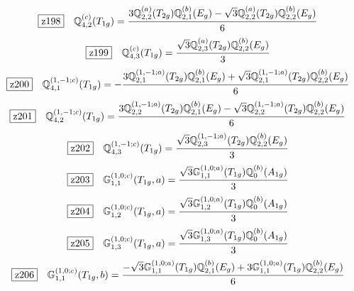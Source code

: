 \documentclass[fleqn,10pt,landscape]{jsarticle}
\begin{document}
\begin{dmath*}
\hspace*{3mm}\fbox{z198}\quad \mathbb{Q}_{4,2}^{(c)}(T_{1g})=\frac{3 \mathbb{Q}_{2,2}^{(a)}(T_{2g}) \mathbb{Q}_{2,1}^{(b)}(E_{g}) - \sqrt{3} \mathbb{Q}_{2,2}^{(a)}(T_{2g}) \mathbb{Q}_{2,2}^{(b)}(E_{g})}{6}
\end{dmath*}
\begin{dmath*}
\hspace*{3mm}\fbox{z199}\quad \mathbb{Q}_{4,3}^{(c)}(T_{1g})=\frac{\sqrt{3} \mathbb{Q}_{2,3}^{(a)}(T_{2g}) \mathbb{Q}_{2,2}^{(b)}(E_{g})}{3}
\end{dmath*}
\begin{dmath*}
\hspace*{3mm}\fbox{z200}\quad \mathbb{Q}_{4,1}^{(1,-1;c)}(T_{1g})=- \frac{3 \mathbb{Q}_{2,1}^{(1,-1;a)}(T_{2g}) \mathbb{Q}_{2,1}^{(b)}(E_{g}) + \sqrt{3} \mathbb{Q}_{2,1}^{(1,-1;a)}(T_{2g}) \mathbb{Q}_{2,2}^{(b)}(E_{g})}{6}
\end{dmath*}
\begin{dmath*}
\hspace*{3mm}\fbox{z201}\quad \mathbb{Q}_{4,2}^{(1,-1;c)}(T_{1g})=\frac{3 \mathbb{Q}_{2,2}^{(1,-1;a)}(T_{2g}) \mathbb{Q}_{2,1}^{(b)}(E_{g}) - \sqrt{3} \mathbb{Q}_{2,2}^{(1,-1;a)}(T_{2g}) \mathbb{Q}_{2,2}^{(b)}(E_{g})}{6}
\end{dmath*}
\begin{dmath*}
\hspace*{3mm}\fbox{z202}\quad \mathbb{Q}_{4,3}^{(1,-1;c)}(T_{1g})=\frac{\sqrt{3} \mathbb{Q}_{2,3}^{(1,-1;a)}(T_{2g}) \mathbb{Q}_{2,2}^{(b)}(E_{g})}{3}
\end{dmath*}
\begin{dmath*}
\hspace*{3mm}\fbox{z203}\quad \mathbb{G}_{1,1}^{(1,0;c)}(T_{1g},a)=\frac{\sqrt{3} \mathbb{G}_{1,1}^{(1,0;a)}(T_{1g}) \mathbb{Q}_{0}^{(b)}(A_{1g})}{3}
\end{dmath*}
\begin{dmath*}
\hspace*{3mm}\fbox{z204}\quad \mathbb{G}_{1,2}^{(1,0;c)}(T_{1g},a)=\frac{\sqrt{3} \mathbb{G}_{1,2}^{(1,0;a)}(T_{1g}) \mathbb{Q}_{0}^{(b)}(A_{1g})}{3}
\end{dmath*}
\begin{dmath*}
\hspace*{3mm}\fbox{z205}\quad \mathbb{G}_{1,3}^{(1,0;c)}(T_{1g},a)=\frac{\sqrt{3} \mathbb{G}_{1,3}^{(1,0;a)}(T_{1g}) \mathbb{Q}_{0}^{(b)}(A_{1g})}{3}
\end{dmath*}
\begin{dmath*}
\hspace*{3mm}\fbox{z206}\quad \mathbb{G}_{1,1}^{(1,0;c)}(T_{1g},b)=\frac{- \sqrt{3} \mathbb{G}_{1,1}^{(1,0;a)}(T_{1g}) \mathbb{Q}_{2,1}^{(b)}(E_{g}) + 3 \mathbb{G}_{1,1}^{(1,0;a)}(T_{1g}) \mathbb{Q}_{2,2}^{(b)}(E_{g})}{6}
\end{dmath*}
\end{document}

